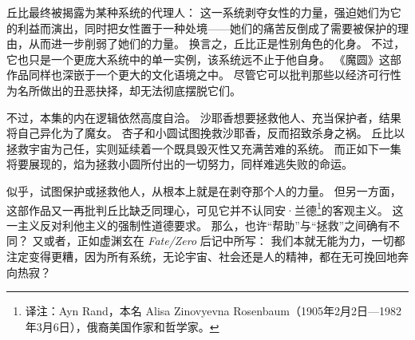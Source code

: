 丘比最终被揭露为某种系统的代理人：
这一系统剥夺女性的力量，强迫她们为它的利益而演出，同时把女性置于一种处境——她们的痛苦反倒成了需要被保护的理由，从而进一步削弱了她们的力量。
换言之，丘比正是性别角色的化身。
不过，它也只是一个更庞大系统中的单一实例，该系统远不止于他自身。
《魔圆》这部作品同样也深嵌于一个更大的文化语境之中。
尽管它可以批判那些以经济可行性为名所做出的丑恶抉择，却无法彻底摆脱它们。

不过，本集的内在逻辑依然高度自洽。
沙耶香想要拯救他人、充当保护者，结果将自己异化为了魔女。
杏子和小圆试图挽救沙耶香，反而招致杀身之祸。
丘比以拯救宇宙为己任，实则延续着一个既具毁灭性又充满苦难的系统。
而正如下一集将要展现的，焰为拯救小圆所付出的一切努力，同样难逃失败的命运。

似乎，试图保护或拯救他人，从根本上就是在剥夺那个人的力量。
但另一方面，这部作品又一再批判丘比缺乏同理心，可见它并不认同安·兰德\footnote{%
    译注：Ayn Rand，本名 Alisa Zinovyevna Rosenbaum（1905年2月2日—1982年3月6日），俄裔美国作家和哲学家。
}的客观主义。
这一主义反对利他主义的强制性道德要求\cite{ref61}。
那么，也许“帮助”与“拯救”之间确有不同？
又或者，正如虚渊玄在 \emph{Fate/Zero} 后记中所写：
我们本就无能为力，一切都注定变得更糟，因为所有系统，无论宇宙、社会还是人的精神，都在无可挽回地奔向热寂\cite{ref29}？
